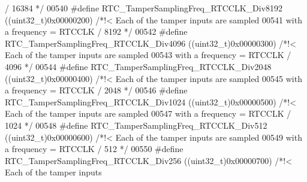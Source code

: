 \begin{DoxyCode}
{       / 16384 */}
00540 \textcolor{preprocessor}{#}\textcolor{preprocessor}{define} \textcolor{preprocessor}{RTC\_TamperSamplingFreq\_RTCCLK\_Div8192}   \textcolor{preprocessor}{(}\textcolor{preprocessor}{(}\textcolor{preprocessor}{uint32\_t}\textcolor{preprocessor}{)}0x00000200\textcolor{preprocessor}{)} \textcolor{comment}{/*!< Each of the tamper inputs
       are sampled}
00541 \textcolor{comment}{                                                                           with a frequency =  RTCCLK
       / 8192  */}
00542 \textcolor{preprocessor}{#}\textcolor{preprocessor}{define} \textcolor{preprocessor}{RTC\_TamperSamplingFreq\_RTCCLK\_Div4096}   \textcolor{preprocessor}{(}\textcolor{preprocessor}{(}\textcolor{preprocessor}{uint32\_t}\textcolor{preprocessor}{)}0x00000300\textcolor{preprocessor}{)} \textcolor{comment}{/*!< Each of the tamper inputs
       are sampled}
00543 \textcolor{comment}{                                                                           with a frequency =  RTCCLK
       / 4096  */}
00544 \textcolor{preprocessor}{#}\textcolor{preprocessor}{define} \textcolor{preprocessor}{RTC\_TamperSamplingFreq\_RTCCLK\_Div2048}   \textcolor{preprocessor}{(}\textcolor{preprocessor}{(}\textcolor{preprocessor}{uint32\_t}\textcolor{preprocessor}{)}0x00000400\textcolor{preprocessor}{)} \textcolor{comment}{/*!< Each of the tamper inputs
       are sampled}
00545 \textcolor{comment}{                                                                           with a frequency =  RTCCLK
       / 2048  */}
00546 \textcolor{preprocessor}{#}\textcolor{preprocessor}{define} \textcolor{preprocessor}{RTC\_TamperSamplingFreq\_RTCCLK\_Div1024}   \textcolor{preprocessor}{(}\textcolor{preprocessor}{(}\textcolor{preprocessor}{uint32\_t}\textcolor{preprocessor}{)}0x00000500\textcolor{preprocessor}{)} \textcolor{comment}{/*!< Each of the tamper inputs
       are sampled}
00547 \textcolor{comment}{                                                                           with a frequency =  RTCCLK
       / 1024  */}
00548 \textcolor{preprocessor}{#}\textcolor{preprocessor}{define} \textcolor{preprocessor}{RTC\_TamperSamplingFreq\_RTCCLK\_Div512}    \textcolor{preprocessor}{(}\textcolor{preprocessor}{(}\textcolor{preprocessor}{uint32\_t}\textcolor{preprocessor}{)}0x00000600\textcolor{preprocessor}{)} \textcolor{comment}{/*!< Each of the tamper inputs
       are sampled}
00549 \textcolor{comment}{                                                                           with a frequency =  RTCCLK
       / 512   */}
00550 \textcolor{preprocessor}{#}\textcolor{preprocessor}{define} \textcolor{preprocessor}{RTC\_TamperSamplingFreq\_RTCCLK\_Div256}    \textcolor{preprocessor}{(}\textcolor{preprocessor}{(}\textcolor{preprocessor}{uint32\_t}\textcolor{preprocessor}{)}0x00000700\textcolor{preprocessor}{)} \textcolor{comment}{/*!< Each of the tamper inputs
}
\end{DoxyCode}
